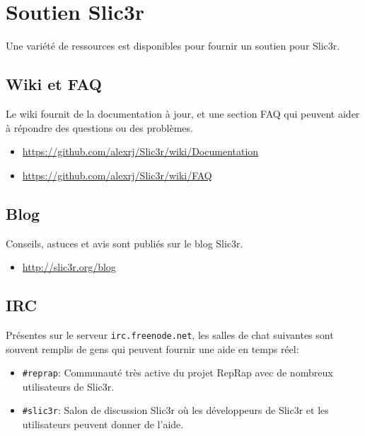 \section{Soutien Slic3r} %
\label{sec:slic3r_support}


Une vari\'et\'e de ressources est disponibles pour fournir un soutien pour Slic3r.
\subsection{Wiki et FAQ} %
\label{sub:wiki_and_faq}
Le wiki fournit de la documentation \`a jour, et une section FAQ qui peuvent aider \`a r\'epondre des questions ou des probl\`emes.
\begin{itemize}
    \item \url{https://github.com/alexrj/Slic3r/wiki/Documentation}
    \item \url{https://github.com/alexrj/Slic3r/wiki/FAQ}
\end{itemize}

\subsection{Blog} %
\label{sub:blog}
Conseils, astuces et avis sont publi\'es sur le blog Slic3r.
\begin{itemize}
    \item \url{http://slic3r.org/blog}
\end{itemize}

\subsection{IRC} %
\label{sub:irc}

Pr\'esentes sur le serveur \texttt{irc.freenode.net}, les salles de chat suivantes sont souvent remplis de gens qui peuvent fournir une aide en temps r\'eel:
\begin{itemize}
\item \texttt{\#reprap}: Communaut\'e tr\`es active du projet RepRap avec de nombreux utilisateurs de Slic3r.
\item \texttt{\#slic3r}: Salon de discussion Slic3r o\`u les d\'eveloppeurs de Slic3r et les utilisateurs peuvent donner de l'aide.
\end{itemize}

